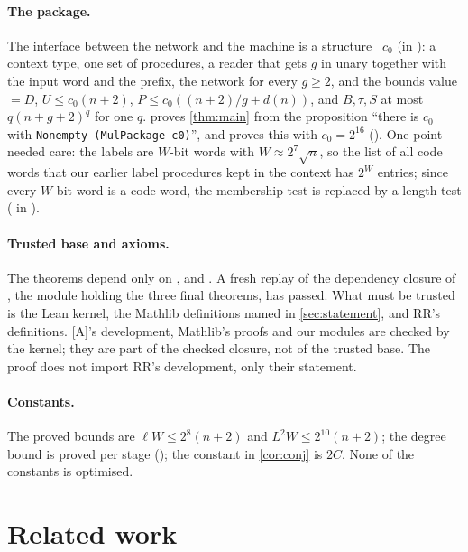 \documentclass[10pt]{amsart}
\theoremstyle{plain}
\theoremstyle{definition}
\theoremstyle{remark}
\numberwithin{equation}{section}
\newcommand{\A}{\textup{[A]}}
\begin{document}
\paragraph{The package.} The interface between the network and the machine is a structure
~$c_0$ (in ): a context type, one set of procedures, a reader that gets $g$ in
unary together with the input word and the prefix, the network for every $g\ge2$, and the bounds
value $=D$, $U\le c_0(n+2)$, $P\le c_0((n+2)/g+d(n))$, and $B,\tau,S$ at most $q(n+g+2)^q$ for one $q$.
 proves \cref{thm:main} from the proposition ``there is $c_0$ with \texttt{Nonempty (MulPackage c0)}'', and
 proves this with $c_0=2^{16}$ (). One point needed care:
the labels are $W$-bit words with $W\approx2^7\sqrt n$, so the list of all code words that our earlier
label procedures kept in the context has $2^W$ entries; since every $W$-bit word is a code word, the
membership test is replaced by a length test ( in ).

\paragraph{Trusted base and axioms.} The theorems depend only on , 
and .
A fresh  replay of the dependency closure of , the module holding the three final theorems,
has passed.
What must be trusted is the Lean kernel, the Mathlib definitions named in \cref{sec:statement}, and RR's
definitions. \A's development, Mathlib's proofs and our modules are checked by the kernel; they are
part of the checked closure, not of the trusted base. The proof does not import RR's development, only
their statement.

\paragraph{Constants.} The proved bounds are $\ell W\le2^8(n+2)$ and $L^2W\le2^{10}(n+2)$; the degree bound
is proved per stage (); the constant in \cref{cor:conj} is $2C$. None of the constants is
optimised.

\section{Related work}\label{sec:related}
\end{document}
